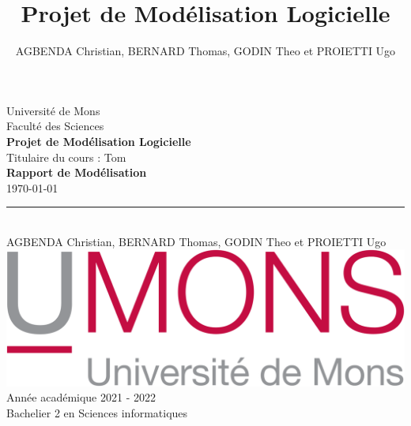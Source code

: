 \documentclass[french, a4paper, 12pt]{article}
\begin{document}
\nocite{*}

\begin{titlepage}
\begin{center}

Université de Mons\\Faculté des Sciences \\ \vspace{5mm}
\textbf{Projet de Modélisation Logicielle} \\ \vspace{5mm}
Titulaire du cours : Tom  \\        \vspace{25mm}
\LARGE{\textbf{Rapport de Modélisation }\\            \vspace{2mm}
}
\small{\today}\\
\rule{10cm}{3pt}\\                           \vspace{10mm}
\LARGE{AGBENDA Christian, BERNARD Thomas, GODIN Theo et PROIETTI Ugo  \bsc{}  \bsc{} } \\
\vspace{50mm}
\includegraphics[scale=0.25]{UMons.png}\\
\vspace{20pt}
Année académique 2021 - 2022\\
Bachelier 2 en Sciences informatiques\\
\end{center}

\end{titlepage}

\title{Projet de Modélisation Logicielle}
\author{AGBENDA Christian, BERNARD Thomas, GODIN Theo et PROIETTI Ugo}
\maketitle
\tableofcontents
\newpage

\end{document}
